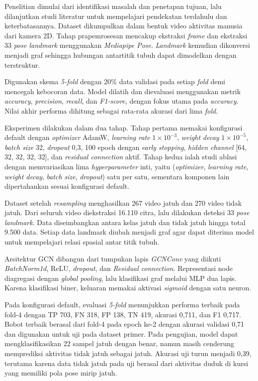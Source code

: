 \begin{center}
Penelitian dimulai dari identifikasi masalah dan penetapan tujuan, lalu dilanjutkan studi literatur untuk mempelajari pendekatan terdahulu dan keterbatasannya. Dataset dikumpulkan dalam bentuk video aktivitas manusia dari kamera 2D. Tahap prapemrosesan mencakup ekstraksi \textit{frame} dan ekstraksi 33 \textit{pose landmark} menggunakan \textit{Mediapipe Pose}. \textit{Landmark} kemudian dikonversi menjadi graf sehingga hubungan antartitik tubuh dapat dimodelkan dengan terstruktur.

Digunakan skema \textit{5-fold} dengan 20\% data validasi pada setiap \textit{fold} demi mencegah kebocoran data. Model dilatih dan dievaluasi menggunakan metrik \textit{accuracy}, \textit{precision}, \textit{recall}, dan \textit{F1-score}, dengan fokus utama pada \textit{accuracy}. Nilai akhir performa dihitung sebagai rata-rata akurasi dari lima \textit{fold}. 

Eksperimen dilakukan dalam dua tahap. Tahap pertama memakai konfigurasi default dengan \textit{optimizer} AdamW, \textit{learning rate} $1\times10^{-3}$, \textit{weight decay} $1\times10^{-5}$, \textit{batch size} 32, \textit{dropout} 0{,}3, 100 epoch dengan \textit{early stopping}, \textit{hidden channel} [64, 32, 32, 32, 32], dan \textit{residual connection} aktif. Tahap kedua ialah studi ablasi dengan memvariasikan lima \textit{hyperparameter} inti, yaitu (\textit{optimizer}, \textit{learning rate}, \textit{weight decay}, \textit{batch size}, \textit{dropout}) satu per satu, sementara komponen lain dipertahankan sesuai konfigurasi default. \par

Dataset setelah \textit{resampling} menghasilkan 267 video jatuh dan 270 video tidak jatuh. Dari seluruh video diekstraksi 16.110 citra, lalu dilakukan deteksi 33 \textit{pose landmark}. Data diseimbangkan antara kelas jatuh dan tidak jatuh hingga total 9.500 data. Setiap data landmark diubah menjadi graf agar dapat diterima model untuk mempelajari relasi spasial antar titik tubuh. 

Arsitektur GCN dibangun dari tumpukan lapis \textit{GCNConv} yang diikuti \textit{BatchNorm1d}, ReLU, \textit{dropout}, dan \textit{Residual connection}. Representasi node diagregasi dengan \textit{global pooling}, lalu klasifikasi graf melalui MLP dua lapis. Karena klasifikasi biner, keluaran memakai aktivasi \textit{sigmoid} dengan satu neuron. 

Pada konfigurasi default, evaluasi \textit{5-fold} menunjukkan performa terbaik pada fold-4 dengan TP 703, FN 318, FP 138, TN 419, akurasi 0,711, dan F1 0,717. Bobot terbaik berasal dari fold-4 pada epoch ke-2 dengan akurasi validasi 0,71 dan digunakan untuk uji pada dataset primer. Pada pengujian, model dapat mengklasifikasikan 22 sampel jatuh dengan benar, namun masih cenderung memprediksi aktivitas tidak jatuh sebagai jatuh. Akurasi uji turun menjadi 0,39, terutama karena data tidak jatuh pada uji berasal dari aktivitas duduk di kursi yang memiliki pola pose mirip jatuh. \par


\end{center}
